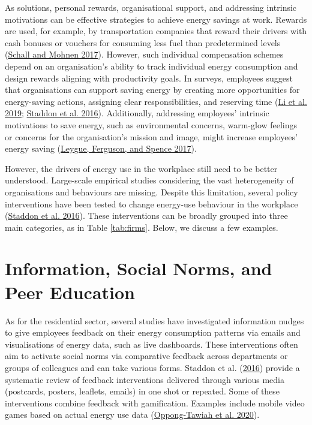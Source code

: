 \documentclass[
  12pt,
  captions=heading]{scrreport}
\begin{document}
As solutions, personal rewards, organisational support, and addressing
intrinsic motivations can be effective strategies to achieve energy
savings at work. Rewards are used, for example, by transportation
companies that reward their drivers with cash bonuses or vouchers for
consuming less fuel than predetermined levels
(\protect\hyperlink{ref-schall2017incentivizing}{Schall and Mohnen
2017}). However, such individual compensation schemes depend on an
organisation's ability to track individual energy consumption and design
rewards aligning with productivity goals. In surveys, employees suggest
that organisations can support saving energy by creating more
opportunities for energy-saving actions, assigning clear
responsibilities, and reserving time
(\protect\hyperlink{ref-li2019understanding}{Li et al. 2019};
\protect\hyperlink{ref-staddon2016intervening}{Staddon et al. 2016}).
Additionally, addressing employees' intrinsic motivations to save
energy, such as environmental concerns, warm-glow feelings or concerns
for the organisation's mission and image, might increase employees'
energy saving (\protect\hyperlink{ref-leygue2017saving}{Leygue,
Ferguson, and Spence 2017}).

However, the drivers of energy use in the workplace still need to be
better understood. Large-scale empirical studies considering the vast
heterogeneity of organisations and behaviours are missing. Despite this
limitation, several policy interventions have been tested to change
energy-use behaviour in the workplace
(\protect\hyperlink{ref-staddon2016intervening}{Staddon et al. 2016}).
These interventions can be broadly grouped into three main categories,
as in Table \ref{tab:firms}. Below, we discuss a few examples.

\hypertarget{information-social-norms-and-peer-education}{%
\section{Information, Social Norms, and Peer
Education}\label{information-social-norms-and-peer-education}}

As for the residential sector, several studies have investigated
information nudges to give employees feedback on their energy
consumption patterns via emails and visualisations of energy data, such
as live dashboards. These interventions often aim to activate social
norms via comparative feedback across departments or groups of
colleagues and can take various forms. Staddon et al.
(\protect\hyperlink{ref-staddon2016intervening}{2016}) provide a
systematic review of feedback interventions delivered through various
media (postcards, posters, leaflets, emails) in one shot or repeated.
Some of these interventions combine feedback with gamification. Examples
include mobile video games based on actual energy use data
(\protect\hyperlink{ref-oppong2020developing}{Oppong-Tawiah et al.
2020}).
\end{document}
